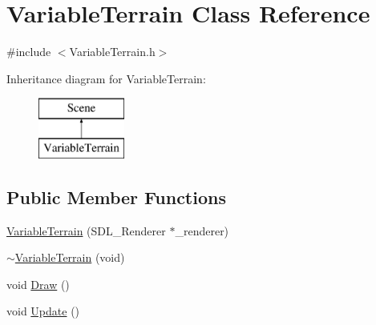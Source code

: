 \hypertarget{class_variable_terrain}{\section{Variable\-Terrain Class Reference}
\label{class_variable_terrain}
}


{\ttfamily \#include $<$Variable\-Terrain.\-h$>$}

Inheritance diagram for Variable\-Terrain\-:\begin{figure}[H]
\begin{center}
\leavevmode
\includegraphics[height=2.000000cm]{class_variable_terrain}
\end{center}
\end{figure}
\subsection*{Public Member Functions}
\begin{DoxyCompactItemize}
\item 
\hyperlink{class_variable_terrain_a114ca86308369f464e63fc03560caa9e}{Variable\-Terrain} (S\-D\-L\-\_\-\-Renderer $\ast$\-\_\-renderer)
\item 
\hyperlink{class_variable_terrain_a27c1ebdc6c0fe991d4ec9cced5de5814}{$\sim$\-Variable\-Terrain} (void)
\item 
void \hyperlink{class_variable_terrain_adf2c137673e2888d603e361368a83467}{Draw} ()
\item 
void \hyperlink{class_variable_terrain_a5084bbc51d4528c20f4b369a342ab0ee}{Update} ()
\end{DoxyCompactItemize}


